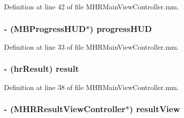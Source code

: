 Definition at line 42 of file M\+H\+R\+Main\+View\+Controller.\+mm.

\hypertarget{category_m_h_r_main_view_controller_07_08_ad7e9d3339af1110426f965b7615b5988}{
\subsubsection[{progress\+H\+U\+D}]{\setlength{\rightskip}{0pt plus 5cm}-\/ ({\bf M\+B\+Progress\+H\+U\+D}$\ast$) progress\+H\+U\+D\hspace{0.3cm}{\ttfamily [protected]}}}\label{category_m_h_r_main_view_controller_07_08_ad7e9d3339af1110426f965b7615b5988}


Definition at line 33 of file M\+H\+R\+Main\+View\+Controller.\+mm.

\hypertarget{category_m_h_r_main_view_controller_07_08_a9dbae9ee1ba7bf908a253626a618ecf6}{
\subsubsection[{result}]{\setlength{\rightskip}{0pt plus 5cm}-\/ ({\bf hr\+Result}) result\hspace{0.3cm}{\ttfamily [protected]}}}\label{category_m_h_r_main_view_controller_07_08_a9dbae9ee1ba7bf908a253626a618ecf6}


Definition at line 38 of file M\+H\+R\+Main\+View\+Controller.\+mm.

\hypertarget{category_m_h_r_main_view_controller_07_08_aee235ca60383f404b812a075eca55e75}{
\subsubsection[{result\+View}]{\setlength{\rightskip}{0pt plus 5cm}-\/ ({\bf M\+H\+R\+Result\+View\+Controller}$\ast$) result\+View\hspace{0.3cm}{\ttfamily [protected]}}}\label{category_m_h_r_main_view_controller_07_08_aee235ca60383f404b812a075eca55e75}


